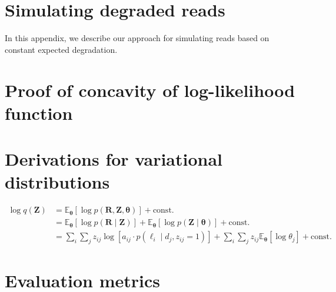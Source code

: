 \chapter{Simulating degraded reads}\label{ap:sim-deg-reads}

In this appendix, we describe our approach for simulating reads based on constant expected degradation.

\chapter{Proof of concavity of log-likelihood function}\label{sec:proof-log-lik}

\lipsum[77]

\chapter{Derivations for variational distributions}\label{sec:variational-dist}

\begin{equation}
\begin{split}
    \log q(\bm{Z}) & = \mathbb{E}_{\bm\theta}\left[\log p(\bm{R},\bm{Z},\bm{\theta})\right] + \textrm{const.} \\
    & = \mathbb{E}_{\bm\theta}\left[\log p(\bm{R}\mid\bm{Z})\right] + \mathbb{E}_{\bm\theta}\left[\log p(\bm{Z}\mid\bm{\theta})\right] + \textrm{const.} \\
    & = \sum_i\sum_j z_{ij}\log\left[a_{ij}\cdot p(\ell_i\mid d_j,z_{ij}=1)\right] + \sum_i\sum_j z_{ij}\mathbb{E}_{\bm\theta}\left[\log\theta_j\right] + \textrm{const.}
\end{split}
\end{equation}

\chapter{Evaluation metrics}

\lipsum[32]